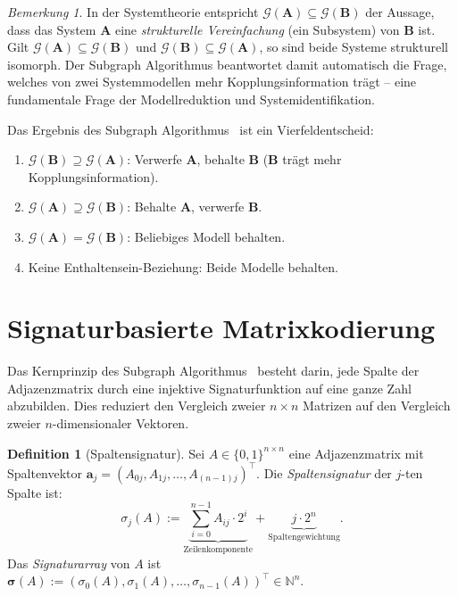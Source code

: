 ﻿\documentclass[12pt, a4paper, titlepage]{report}
\theoremstyle{definition}
\newtheorem{definition}[theorem]{Definition}
\theoremstyle{remark}
\newtheorem{remark}[theorem]{Bemerkung}
\newcommand{\vA}{\bm{A}}
\newcommand{\vB}{\bm{B}}
\newcommand{\T}{\top}
\begin{document}
\begin{remark}
In der Systemtheorie entspricht $\mathcal{G}(\vA) \subseteq \mathcal{G}(\vB)$ der
Aussage, dass das System $\vA$ eine \emph{strukturelle Vereinfachung} (ein
Subsystem) von $\vB$ ist. Gilt $\mathcal{G}(\vA) \subseteq \mathcal{G}(\vB)$
und $\mathcal{G}(\vB) \subseteq \mathcal{G}(\vA)$, so sind beide Systeme strukturell
isomorph. Der Subgraph Algorithmus beantwortet damit automatisch die Frage, welches
von zwei Systemmodellen mehr Kopplungsinformation trägt -- eine fundamentale Frage
der Modellreduktion und Systemidentifikation.
\end{remark}

Das Ergebnis des Subgraph Algorithmus~\citep{epp2026subgraph} ist ein
Vierfeldentscheid:
\begin{enumerate}[label=(\roman*)]
  \item $\mathcal{G}(\vB) \supseteq \mathcal{G}(\vA)$: Verwerfe $\vA$, behalte $\vB$
    ($\vB$ trägt mehr Kopplungsinformation).
  \item $\mathcal{G}(\vA) \supseteq \mathcal{G}(\vB)$: Behalte $\vA$, verwerfe $\vB$.
  \item $\mathcal{G}(\vA) = \mathcal{G}(\vB)$: Beliebiges Modell behalten.
  \item Keine Enthaltensein-Beziehung: Beide Modelle behalten.
\end{enumerate}

\section{Signaturbasierte Matrixkodierung}

Das Kernprinzip des Subgraph Algorithmus~\citep{epp2026subgraph} besteht darin, jede
Spalte der Adjazenzmatrix durch eine injektive Signaturfunktion auf eine ganze Zahl
abzubilden. Dies reduziert den Vergleich zweier $n \times n$ Matrizen auf den Vergleich
zweier $n$-dimensionaler Vektoren.

\begin{definition}[Spaltensignatur]
\label{def:signatur}
Sei $A \in \{0,1\}^{n \times n}$ eine Adjazenzmatrix mit Spaltenvektor
$\bm{a}_j = (A_{0j}, A_{1j}, \ldots, A_{(n-1)j})^\T$.
Die \emph{Spaltensignatur} der $j$-ten Spalte ist:
\begin{equation}
  \sigma_j(A) :=
    \underbrace{\sum_{i=0}^{n-1} A_{ij} \cdot 2^i}_{\text{Zeilenkomponente}}
    + \underbrace{j \cdot 2^n}_{\text{Spaltengewichtung}}.
  \label{eq:signatur}
\end{equation}
Das \emph{Signaturarray} von $A$ ist
$\bm{\sigma}(A) := (\sigma_0(A), \sigma_1(A), \ldots, \sigma_{n-1}(A))^\T \in \mathbb{N}^n$.
\end{definition}
\end{document}
